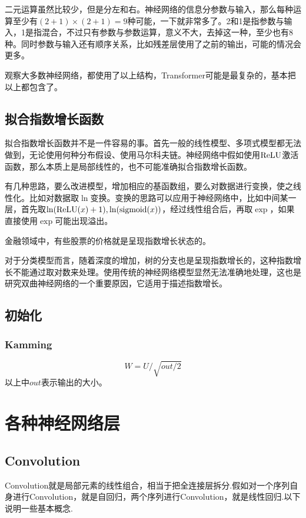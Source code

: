 二元运算虽然比较少，但是分左和右。神经网络的信息分参数与输入，那么每种运算至少有$(2+1)\times(2+1)=9$种可能，一下就非常多了。2和1是指参数与输入，1是指混合，不过只有参数与参数运算，意义不大，去掉这一种，至少也有8种。同时参数与输入还有顺序关系，比如残差层使用了之前的输出，可能的情况会更多。

观察大多数神经网络，都使用了以上结构，Transformer可能是最复杂的，基本把以上都包含了。

\subsection{拟合指数增长函数}
拟合指数增长函数并不是一件容易的事。首先一般的线性模型、多项式模型都无法做到，无论使用何种分布假设、使用马尔科夫链。神经网络中假如使用$\operatorname{ReLU}$激活函数，那么本质上是局部线性的，也不可能准确拟合指数增长函数。

有几种思路，要么改进模型，增加相应的基函数组，要么对数据进行变换，使之线性化。比如对数据取$\ln$变换。变换的思路可以应用于神经网络中，比如中间某一层，首先取$\ln(\operatorname{ReLU}(x)+1),\ln(\text{sigmoid}(x))$，经过线性组合后，再取$\exp$，如果直接使用$\exp$可能出现溢出。

金融领域中，有些股票的价格就是呈现指数增长状态的。

对于分类模型而言，随着深度的增加，树的分支也是呈现指数增长的，这种指数增长不能通过取对数来处理。使用传统的神经网络模型显然无法准确地处理，这也是研究双曲神经网络的一个重要原因，它适用于描述指数增长。

\subsection{初始化}
\subsubsection{Kamming}
\begin{equation}
W=U/\sqrt{out/2}
\end{equation}
以上中$out$表示输出的大小。
\section{各种神经网络层}
\subsection{Convolution}
Convolution就是局部元素的线性组合，相当于把全连接层拆分.假如对一个序列自身进行Convolution，就是自回归，两个序列进行Convolution，就是线性回归.以下说明一些基本概念.

